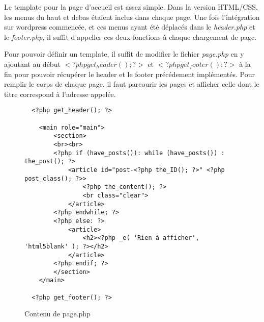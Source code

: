 \documentclass{article}
\begin{document}
Le template pour la page d'accueil est assez simple. Dans la version HTML/CSS, les menus du haut et debas étaient inclus dans chaque page. Une fois l'intégration sur wordpress commencée, et ces menus ayant été déplacés dans le \textit{header.php} et le \textit{footer.php}, il suffit d'appeller ces deux fonctions à chaque chargement de page.

Pour pouvoir définir un template, il suffit de modifier le fichier \textit{page.php} en y ajoutant au début \textit{$<?php get_header(); ?>$} et \textit{$<?php get_footer(); ?>$} à la fin pour pouvoir récupérer le header et le footer précédement implémentés. Pour remplir le corps de chaque page, il faut parcourir les pages et afficher celle dont le titre correspond à l'adresse appelée.

\begin{figure}
\begin{Verbatim}
  <?php get_header(); ?>

  	<main role="main">
  		<section>
  		<br><br>
  		<?php if (have_posts()): while (have_posts()) : the_post(); ?>
  			<article id="post-<?php the_ID(); ?>" <?php post_class(); ?>>
  				<?php the_content(); ?>
  				<br class="clear">
  			</article>
  		<?php endwhile; ?>
  		<?php else: ?>
  			<article>
  				<h2><?php _e( 'Rien à afficher', 'html5blank' ); ?></h2>
  			</article>
  		<?php endif; ?>
  		</section>
  	</main>

  <?php get_footer(); ?>
\end{Verbatim}
\caption{Contenu de page.php}
\end{figure}
\end{document}
